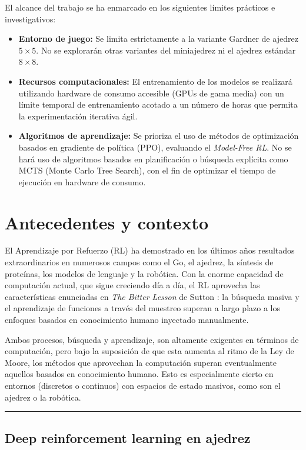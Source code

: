 \documentclass[12pt, a4paper]{article}
\let\cite\supercite
\begin{document}
El alcance del trabajo se ha enmarcado en los siguientes límites prácticos e investigativos:
\begin{itemize}
    \item \textbf{Entorno de juego:} Se limita estrictamente a la variante Gardner de ajedrez $5\times5$. No se explorarán otras variantes del miniajedrez ni el ajedrez estándar $8\times8$.
    \item \textbf{Recursos computacionales:} El entrenamiento de los modelos se realizará utilizando hardware de consumo accesible (GPUs de gama media) con un límite temporal de entrenamiento acotado a un número de horas que permita la experimentación iterativa ágil.
    \item \textbf{Algoritmos de aprendizaje:} Se prioriza el uso de métodos de optimización basados en gradiente de política (PPO), evaluando el \textit{Model-Free RL}. No se hará uso de algoritmos basados en planificación o búsqueda explícita como MCTS (Monte Carlo Tree Search), con el fin de optimizar el tiempo de ejecución en hardware de consumo.
\end{itemize}

\newpage

\section{Antecedentes y contexto}\label{sec:antecedentes}

El Aprendizaje por Refuerzo (RL) ha demostrado en los últimos años resultados extraordinarios en numerosos campos como el Go, el ajedrez, la síntesis de proteínas, los modelos de lenguaje y la robótica. Con la enorme capacidad de computación actual, que sigue creciendo día a día, el RL aprovecha las características enunciadas en \textit{The Bitter Lesson} de Sutton \cite{sutton2019bitter}: la búsqueda masiva y el aprendizaje de funciones a través del muestreo superan a largo plazo a los enfoques basados en conocimiento humano inyectado manualmente.

Ambos procesos, búsqueda y aprendizaje, son altamente exigentes en términos de computación, pero bajo la suposición de que esta aumenta al ritmo de la Ley de Moore, los métodos que aprovechan la computación superan eventualmente aquellos basados en conocimiento humano. Esto es especialmente cierto en entornos (discretos o continuos) con espacios de estado masivos, como son el ajedrez o la robótica.

\rule{\textwidth}{0.2pt}
\subsection{Deep reinforcement learning en ajedrez}
\end{document}
